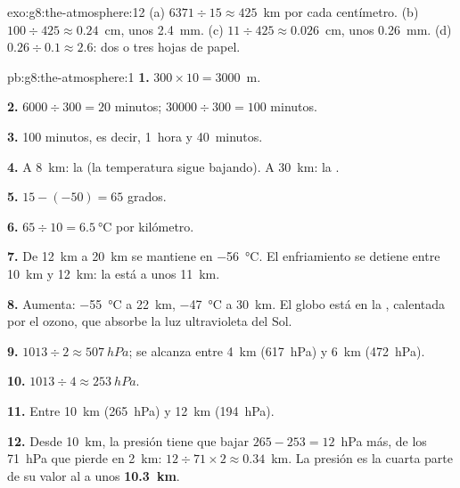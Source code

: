 \begin{solution}{exo:g8:the-atmosphere:12}
(a) $6371 \div 15 \approx 425$~km por cada centímetro. (b) $100 \div 425
\approx 0.24$~cm, unos \qty{2.4}{mm}. (c) $11 \div 425 \approx
0.026$~cm, unos \qty{0.26}{mm}. (d) $0.26 \div 0.1 \approx 2.6$: dos o
tres hojas de papel.
\end{solution}

\begin{solution}{pb:g8:the-atmosphere:1}
\textbf{1.} $300 \times 10 = 3000$~m.

\textbf{2.} $6000 \div 300 = 20$ minutos; $\num{30000} \div 300 = 100$
minutos.

\textbf{3.} 100 minutos, es decir, 1~hora y 40~minutos.

\textbf{4.} A \qty{8}{km}: la  (la temperatura sigue bajando).
A \qty{30}{km}: la .

\textbf{5.} $15 - (-50) = 65$ grados.

\textbf{6.} $65 \div 10 = \qty{6.5}{\degreeCelsius}$ por kilómetro.

\textbf{7.} De \qty{12}{km} a \qty{20}{km} se mantiene en
\qty{-56}{\degreeCelsius}. El enfriamiento se detiene entre \qty{10}{km} y
\qty{12}{km}: la  está a unos \qty{11}{km}.

\textbf{8.} Aumenta: \qty{-55}{\degreeCelsius} a \qty{22}{km},
\qty{-47}{\degreeCelsius} a \qty{30}{km}. El globo está en la
, calentada por el ozono, que absorbe la luz ultravioleta del
Sol.

\textbf{9.} $1013 \div 2 \approx \qty{507}{hPa}$; se alcanza entre
\qty{4}{km} (\qty{617}{hPa}) y \qty{6}{km} (\qty{472}{hPa}).

\textbf{10.} $1013 \div 4 \approx \qty{253}{hPa}$.

\textbf{11.} Entre \qty{10}{km} (\qty{265}{hPa}) y \qty{12}{km}
(\qty{194}{hPa}).

\textbf{12.} Desde \qty{10}{km}, la presión tiene que bajar $265 - 253 =
12$~hPa más, de los 71~hPa que pierde en 2~km: $12 \div 71 \times 2
\approx 0.34$~km. La presión es la cuarta parte de su valor al  a unos \textbf{\qty{10.3}{km}}.
\end{solution}

